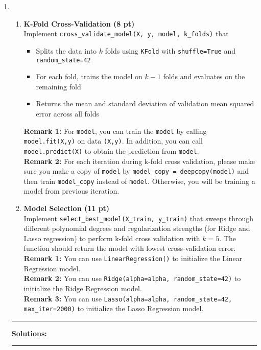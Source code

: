 \documentclass{article}
\theoremstyle{definition}
\theoremstyle{remark}
\newenvironment{Q}
    {%
      \clearpage
      \item
    }
    {%
      \phantom{s}
      \bigskip
    \hrule
    \vspace{1em}
      \textbf{Solutions: } \\
    \hrule
    }
\begin{document}
\begin{enumerate}[font={\Large\bfseries},left=0pt]
\begin{Q}
		\begin{enumerate}
			\item \textbf{K-Fold Cross-Validation (8 pt)}\\
			      Implement \texttt{cross\_validate\_model(X, y, model, k\_folds)} that
			      \begin{itemize}
				      \item Splits the data into $k$ folds using \texttt{KFold} with \texttt{shuffle=True} and \texttt{random\_state=42}
				      \item For each fold, trains the model on $k-1$ folds and evaluates on the remaining fold
				      \item Returns the mean and standard deviation of validation mean squared error across all folds
			      \end{itemize}
			      \textbf{Remark 1:} For \texttt{model}, you can train the \texttt{model} by calling \texttt{model.fit(X,y)} on data \texttt{(X,y)}. In addition, you can call \texttt{model.predict(X)} to obtain the prediction from \texttt{model}. \\
			      \textbf{Remark 2:} For each iteration during k-fold cross validation, please make sure you make a copy of \texttt{model} by \texttt{model\_copy = deepcopy(model)}  and then train \texttt{model\_copy} instead of \texttt{model}. Otherwise, you will be training a model from previous iteration.\\
			\item \textbf{Model Selection (11 pt)} \\
			      Implement \texttt{select\_best\_model(X\_train, y\_train)} that sweeps through different polynomial degrees and regularization strengths (for Ridge and Lasso regression) to perform k-fold cross validation with $k=5$. The function should return the model with lowest cross-validation error. \\
			      \textbf{Remark 1:} You can use \texttt{LinearRegression()} to initialize the Linear Regression model.\\
			      \textbf{Remark 2:} You can use \texttt{Ridge(alpha=alpha, random\_state=42)} to initialize the Ridge Regression model. \\
			      \textbf{Remark 3:} You can use \texttt{Lasso(alpha=alpha, random\_state=42, max\_iter=2000)} to initialize the Lasso Regression model. \\

		\end{enumerate}

	\end{Q}


\end{enumerate}
\end{document}
